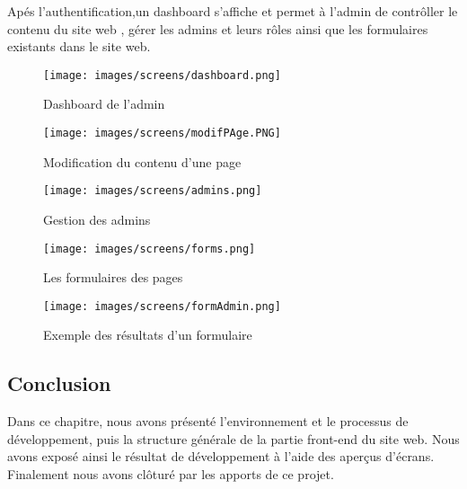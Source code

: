 Apés l'authentification,un dashboard s'affiche et permet à l'admin de contrôller le contenu du site web , gérer les admins et leurs rôles ainsi que les formulaires existants dans le site web.
\begin{figure}[h]
    \begin{minipage}[c]{.46\linewidth}
        \centering
        \texttt{[image: images/screens/dashboard.png]}
        \caption{Dashboard de l'admin}
    \end{minipage}
    \hfill%
    \begin{minipage}[c]{.46\linewidth}
        \centering
        \texttt{[image: images/screens/modifPAge.PNG]}
        \caption{Modification du contenu d'une page}
    \end{minipage}
\end{figure}
\begin{figure}[h]
    \begin{minipage}[c]{.46\linewidth}
        \centering
        \texttt{[image: images/screens/admins.png]}
        \caption{Gestion des admins}
    \end{minipage}
    \hfill%
    \begin{minipage}[c]{.46\linewidth}
        \centering
        \texttt{[image: images/screens/forms.png]}
        \caption{Les formulaires des pages}
    \end{minipage}
\end{figure}
\begin{figure}[!h]  
\begin{center}
\texttt{[image: images/screens/formAdmin.png]}
\end{center}
\caption{Exemple des résultats d'un formulaire}
\end{figure}
\newline

\subsection{Conclusion}
Dans ce chapitre, nous avons présenté l’environnement et le processus de développement, puis la structure générale de la partie front-end du site web. Nous avons exposé ainsi le résultat de développement à l’aide des aperçus d’écrans. Finalement nous avons clôturé par les
apports de ce projet.



